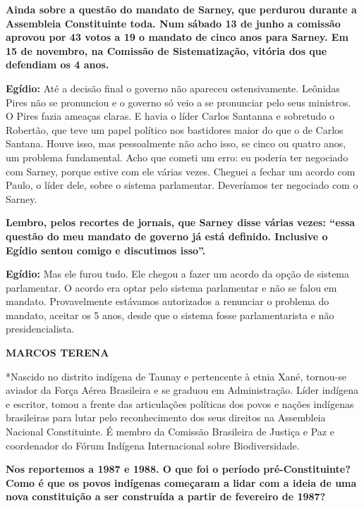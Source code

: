 \textbf{Ainda sobre a questão do mandato de Sarney, que perdurou durante
a Assembleia Constituinte toda. Num sábado 13 de junho a comissão
aprovou por 43 votos a 19 o mandato de cinco anos para Sarney. Em 15 de
novembro, na Comissão de Sistematização, vitória dos que defendiam os 4
anos.}

\textbf{Egídio:} Até a decisão final o governo não apareceu
ostensivamente. Leônidas Pires não se pronunciou e o governo só veio a
se pronunciar pelo seus ministros. O Pires fazia ameaças claras. E havia
o líder Carlos Santanna e sobretudo o Robertão, que teve um papel
político nos bastidores maior do que o de Carlos Santana. Houve isso,
mas pessoalmente não acho isso, se cinco ou quatro anos, um problema
fundamental. Acho que cometi um erro: eu poderia ter negociado com
Sarney, porque estive com ele várias vezes. Cheguei a fechar um acordo
com Paulo, o líder dele, sobre o sistema parlamentar. Deveríamos ter
negociado com o Sarney.

\textbf{Lembro, pelos recortes de jornais, que Sarney disse várias
vezes: ``essa questão do meu mandato de governo já está definido.
Inclusive o Egídio sentou comigo e discutimos isso''.}

\textbf{Egídio:} Mas ele furou tudo. Ele chegou a fazer um acordo da
opção de sistema parlamentar. O acordo era optar pelo sistema
parlamentar e não se falou em mandato. Provavelmente estávamos
autorizados a renunciar o problema do mandato, aceitar os 5 anos, desde
que o sistema fosse parlamentarista e não presidencialista.

\textbf{MARCOS TERENA}

*Nascido no distrito indígena de Taunay e pertencente à etnia Xané,
tornou-se aviador da Força Aérea Brasileira e se graduou em
Administração. Líder indígena e escritor, tomou a frente das
articulações políticas dos povos e nações indígenas brasileiras para
lutar pelo reconhecimento dos seus direitos na Assembleia Nacional
Constituinte. É membro da Comissão Brasileira de Justiça e Paz e
coordenador do Fórum Indígena Internacional sobre Biodiversidade.

\textbf{Nos reportemos a 1987 e 1988. O que foi o período
pré-Constituinte? Como é que os povos indígenas começaram a lidar com a
ideia de uma nova constituição a ser construída a partir de fevereiro de
1987?}

